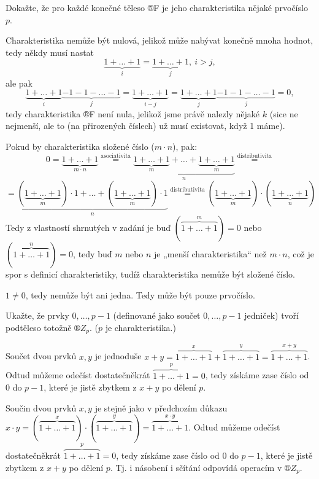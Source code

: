 \documentclass[12pt]{article}					%
\begin{document}
    \begin{priklad}[6.2]
        Dokažte, že pro každé konečné těleso ®F je jeho charakteristika nějaké prvočíslo $p$.

        \begin{dukazin}
            Charakteristika nemůže být nulová, jelikož může nabývat konečně mnoha hodnot, tedy někdy musí nastat
            $$ \underbrace{1+…+1}_{i} = \underbrace{1+…+1}_{j},\ i>j, $$
            ale pak
            $$ \underbrace{1+…+1}_{i} \underbrace{-1-1-…-1}_{j} = \underbrace{1+…+1}_{i-j} = \underbrace{1+…+1}_{j} \underbrace{-1-1-…-1}_{j} = 0, $$
            tedy charakteristika ®F není nula, jelikož jsme právě nalezly nějaké $k$ (sice ne nejmenší, ale to (na přirozených číslech) už musí existovat, když 1 máme).

            Pokud by charakteristika složené číslo ($m·n$), pak:
            $$ 0 = \underbrace{1+…+1}_{m·n} \overset{\text{asociativita}}{=} \underbrace{\underbrace{1+…+1}_{m} + … + \underbrace{1+…+1}_{m}}_{n} \overset{\text{distributivita}}{=} $$
            $$ = \underbrace{(\underbrace{1+…+1}_{m})·1 + … + (\underbrace{1+…+1}_{m})·1}_{n} \overset{\text{distributivita}}{=} (\underbrace{1+…+1}_{m})·(\underbrace{1+…+1}_{n})$$
            Tedy z vlastností shrnutých v zadání je buď $(\overbrace{1+…+1}^{m}) = 0$ nebo $(\overbrace{1+…+1}^{n}) = 0$, tedy buď $m$ nebo $n$ je „menší charakteristika“ než $m·n$, což je spor s definicí charakteristiky, tudíž charakteristika nemůže být složené číslo.

            $1≠0$, tedy nemůže být ani jedna. Tedy může být pouze prvočíslo.
        \end{dukazin}
    \end{priklad}

    \begin{priklad}[6.3]
        Ukažte, že prvky $0, …, p-1$ (definované jako součet $0, …, p-1$ jedniček) tvoří podtěleso totožně $®Z_p$. ($p$ je charakteristika.)
        
        \begin{dukazin}
            Součet dvou prvků $x, y$ je jednoduše $ x + y = \overbrace{1+…+1}^{x} + \overbrace{1+…+1}^{y} = \overbrace{1+…+1}^{x+y}$. Odtud můžeme odečíst dostatečněkrát $\overbrace{1+…+1}^{p} = 0$, tedy získáme zase číslo od $0$ do $p-1$, které je jistě zbytkem z $x+y$ po dělení $p$.

            Součin dvou prvků $x, y$ je stejně jako v předchozím důkazu $ x · y = (\overbrace{1+…+1}^{x}) · (\overbrace{1+…+1}^{y}) = \overbrace{1+…+1}^{x·y}$. Odtud můžeme odečíst dostatečněkrát $\overbrace{1+…+1}^{p} = 0$, tedy získáme zase číslo od $0$ do $p-1$, které je jistě zbytkem z $x+y$ po dělení $p$. Tj. i násobení i sčítání odpovídá operacím v $®Z_p$.
        \end{dukazin}
    \end{priklad}
\end{document}
